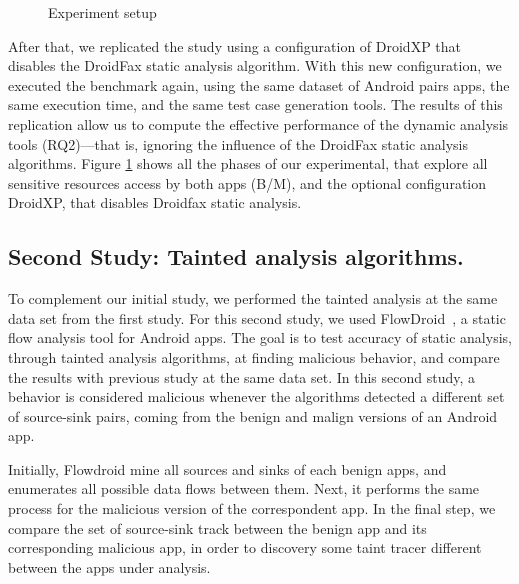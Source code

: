 \begin{figure}[ht]
   \label{Experiment setup}
   \caption{Experiment setup}
   \label{fig:setup}
 \end{figure}

After that, we replicated the study using a configuration of DroidXP that disables the DroidFax static analysis algorithm. With this new configuration, we executed the benchmark again, using the same dataset of Android pairs apps, the same execution time, and the same test case generation tools.
The results of this replication allow us to compute the effective performance
of the dynamic analysis tools (RQ2)---that is, ignoring the influence of the
DroidFax static analysis algorithms. Figure \ref{fig:setup} shows all the phases of our experimental, that explore all sensitive resources access by both apps (B/M), and the optional configuration DroidXP, that disables Droidfax static analysis.

\subsection{Second Study: Tainted analysis algorithms.}

To complement our initial study, we performed the tainted analysis at the same
data set from the first study. For this second study, we used
FlowDroid~\cite{10.1145/2666356.2594299}, a static flow analysis tool for Android apps.
The goal is to test accuracy of static analysis, through tainted analysis algorithms, at finding malicious behavior, and compare the results with previous study at the same data set.
In this second study, a behavior is considered malicious whenever the algorithms
detected a different set of source-sink pairs, coming from the benign and malign
versions of an Android app. 

Initially, Flowdroid mine all sources and sinks of each benign apps, and enumerates all possible data flows between them. Next, it performs the same process for the malicious version
of the correspondent app. In the final step, we compare the set of source-sink track between the benign app and its corresponding malicious app, in order to discovery some taint tracer different between the apps under analysis.

